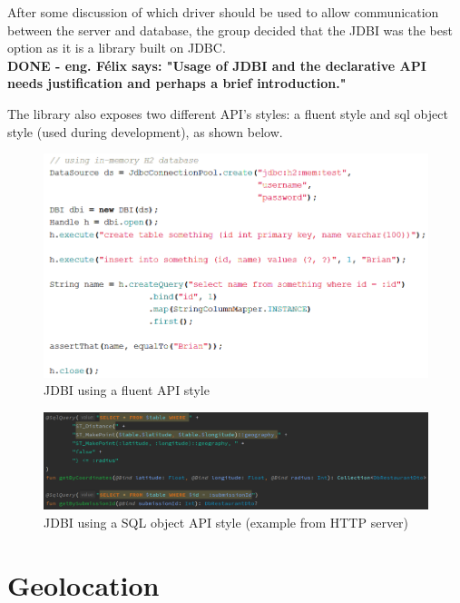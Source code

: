 After some discussion of which driver should be used to allow communication between the server and database, the group decided that the JDBI was the best
option as it is a library built on JDBC.\\

\textbf{DONE - eng. Félix says: "Usage of JDBI and the declarative API needs justification and perhaps a brief introduction."}

The library also exposes two different API's styles: a fluent style and sql object style (used during development), as shown below.

\begin{figure}[H]
    \begin{center}
        \includegraphics[scale=0.5]{_figures/fluentApiJdbi.png}
        \caption{JDBI using a fluent API style}
    \end{center}
\end{figure}

\begin{figure}[H]
    \begin{center}
        \includegraphics[scale=0.5]{_figures/sqlObjectJdbi.png}
        \caption{JDBI using a SQL object API style (example from HTTP server)}
    \end{center}
\end{figure}

\section{Geolocation}

